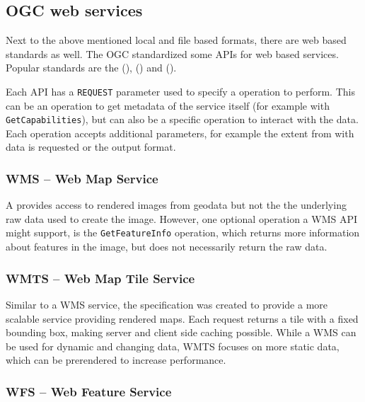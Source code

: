 	
	
	\subsection{OGC web services}
	
		Next to the above mentioned local and file based formats, there are web based standards as well.
		The OGC standardized some APIs for web based services.
		Popular standards are the  (),  () and  ().
		
		Each API has a \texttt{REQUEST} parameter used to specify a operation to perform.
		This can be an operation to get metadata of the service itself (for example with \texttt{GetCapabilities}), but can also be a specific operation to interact with the data.
		Each operation accepts additional parameters, for example the extent from with data is requested or the output format.
		
		
		\subsubsection{WMS -- Web Map Service}
		
			A  provides access to rendered images from geodata but not the the underlying raw data used to create the image.
			However, one optional operation a WMS API might support, is the \texttt{GetFeatureInfo} operation\cite[38]{ogc-wms}, which returns more information about features in the image, but does not necessarily return the raw data.
		
		\subsubsection{WMTS -- Web Map Tile Service}
		
			Similar to a WMS service, the  specification was created to provide a more scalable service providing rendered maps\cite[12]{ogc-wmts}.
			Each request returns a tile with a fixed bounding box, making server and client side caching possible.
			While a WMS can be used for dynamic and changing data, WMTS focuses on more static data, which can be prerendered to increase performance\cite[13]{ogc-wmts}.
		
		\subsubsection{WFS -- Web Feature Service}
		
